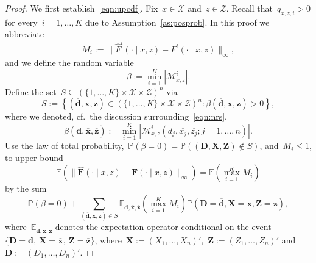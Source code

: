\documentclass[11pt, a4paper]{article}
\theoremstyle{definition}
\begin{document}
\begin{proof}
We first establish~\eqref{eqn:upcdf}. Fix~$x \in \mathcal{X}$ and~$z \in \mathcal{Z}$. Recall that~$q_{x,z,i} > 0$ for every~$i = 1, \hdots, K$ due to Assumption~\ref{as:posprob}. In this proof we abbreviate~$$M_i := \| \hat{F}^i(\cdot \mid  x, z) - F^i(\cdot\mid x, z)\|_{\infty},$$ and we define the random variable~$$\beta := \min_{i = 1}^K |\mathcal{M}_{x, z}^i|.$$ Define the set~$S \subseteq \left(\{1, \hdots, K\} \times \mathcal{X} \times \mathcal{Z}\right)^n$ via 
%
\begin{equation*}
S := \left\{(\overline{\bm{d}}, \overline{\bm{x}}, \overline{\bm{z}})\in \left(\{1, \hdots, K\} \times \mathcal{X} \times \mathcal{Z}\right)^n: \beta(\overline{\bm{d}}, \overline{\bm{x}}, \overline{\bm{z}})  > 0\right\},
\end{equation*}
%
where we denoted, cf.~the discussion surrounding~\eqref{eqn:nrs}, $$\beta(\overline{\bm{d}}, \overline{\bm{x}}, \overline{\bm{z}}) := \min_{i = 1}^K \left| \mathcal{M}_{x, z}^i(\overline{d_j}, \overline{x_j}, \overline{z_j}; j = 1, \hdots, n) \right|.$$ Use the law of total probability,~$\mathbb{P}(\beta = 0) = \mathbb{P}((\bm{D}, \bm{X}, \bm{Z}) \notin S)$, and~$M_i \leq 1$, to upper bound $$\mathbb{E} (\| \hat{\bm{F}}(\cdot \mid x, z) - \bm{F}(\cdot\mid x, z)\|_{\infty}) = \mathbb{E}(\max_{i = 1}^K  M_i)$$ by the sum
%
\begin{equation}\label{eqn:expa}
\mathbb{P}\left(\beta = 0\right) +  \sum_{(\overline{\bm{d}}, \overline{\bm{x}}, \overline{\bm{z}}) \in S} \mathbb{E}_{\overline {\bm d}, \overline {\bm x},  \overline {\bm z}} \left ( \max_{i = 1}^K M_i \right) \mathbb{P}(\bm D = \overline{\bm{d}}, \bm{X} = \overline{\bm{x}}, \bm{Z} = \overline{\bm{z}}),
\end{equation}
%
where~$\mathbb{E}_{\overline{\bm{d}}, \overline{\bm{x}}, \overline{\bm{z}}}$ denotes the expectation operator conditional on the event~$\{\bm{D} = \overline{\bm{d}},~\bm{X} =  \overline{\bm{x}},~\bm{Z} = \overline{\bm{z}}\}$, where~$\bm{X} := (X_1, \hdots, X_n)'$,~$\bm{Z} := (Z_1, \hdots, Z_n)'$ and~$\bm{D} := (D_1, \hdots, D_n)'$.


\end{proof}
\end{document}
